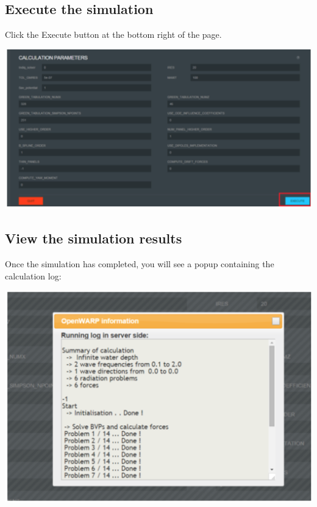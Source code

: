 \documentclass[12pt]{article}
\begin{document}
\subsection{ Execute the simulation}
Click the Execute button at the bottom right of the page.

\vspace{\abovedisplayskip}
\begin{minipage}{\linewidth}
	\centering
	\includegraphics[scale=0.4]{img/29}
\end{minipage}
\vspace{\belowdisplayskip}




\subsection{View the simulation results}
Once the simulation has completed, you will see a popup containing the calculation log:

\vspace{\abovedisplayskip}
\begin{minipage}{\linewidth}
	\centering
	\includegraphics[scale=0.4]{img/30}
\end{minipage}
\vspace{\belowdisplayskip}
\end{document}
